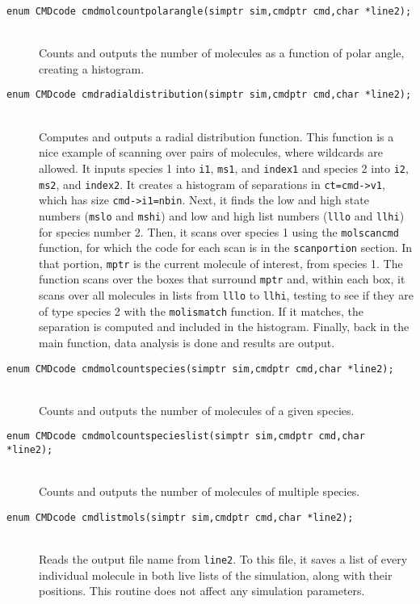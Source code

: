\documentclass {scrbook}
\newcommand {\ttt} {\texttt}
\begin{document}
\begin{description}
\item[\ttt{enum CMDcode cmdmolcountpolarangle(simptr sim,cmdptr cmd,char *line2);}]
\hfill \\
Counts and outputs the number of molecules as a function of polar angle, creating a histogram.

\item[\ttt{enum CMDcode cmdradialdistribution(simptr sim,cmdptr cmd,char *line2);}]
\hfill \\
Computes and outputs a radial distribution function. This function is a nice example of scanning over pairs of molecules, where wildcards are allowed. It inputs species 1 into \ttt{i1}, \ttt{ms1}, and \ttt{index1} and species 2 into \ttt{i2}, \ttt{ms2}, and \ttt{index2}. It creates a histogram of separations in \ttt{ct=cmd->v1}, which has size \ttt{cmd->i1=nbin}. Next, it finds the low and high state numbers (\ttt{mslo} and \ttt{mshi}) and low and high list numbers (\ttt{lllo} and \ttt{llhi}) for species number 2. Then, it scans over species 1 using the \ttt{molscancmd} function, for which the code for each scan is in the \ttt{scanportion} section. In that portion, \ttt{mptr} is the current molecule of interest, from species 1. The function scans over the boxes that surround \ttt{mptr} and, within each box, it scans over all molecules in lists from \ttt{lllo} to \ttt{llhi}, testing to see if they are of type species 2 with the \ttt{molismatch} function. If it matches, the separation is computed and included in the histogram. Finally, back in the main function, data analysis is done and results are output.

\item[\ttt{enum CMDcode cmdmolcountspecies(simptr sim,cmdptr cmd,char *line2);}]
\hfill \\
Counts and outputs the number of molecules of a given species.

\item[\ttt{enum CMDcode cmdmolcountspecieslist(simptr sim,cmdptr cmd,char *line2);}]
\hfill \\
Counts and outputs the number of molecules of multiple species.

\item[\ttt{enum CMDcode cmdlistmols(simptr sim,cmdptr cmd,char *line2);}]
\hfill \\
Reads the output file name from \ttt{line2}. To this file, it saves a list of every individual molecule in both live lists of the simulation, along with their positions. This routine does not affect any simulation parameters.


\end{description}
\end{document}
